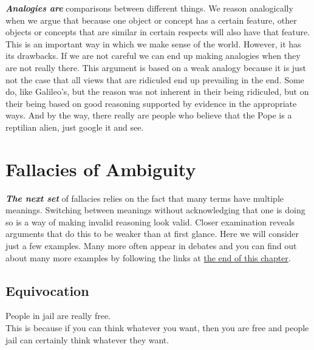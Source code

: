 \documentclass[12pt, openany]{book}
\begin{document}
\textbf{\emph{Analogies are}} comparisons between different things. We reason analogically when we argue that because one object or concept has a certain feature, other objects or concepts that are similar in certain respects will also have that feature. This is an important way in which we make sense of the world. However, it has its drawbacks. If we are not careful we can end up making analogies when they are not really there. This argument is based on a weak analogy because it is just not the case that all views that are ridiculed end up prevailing in the end. Some do, like Galileo's, but the reason was not inherent in their being ridiculed, but on their being based on good reasoning supported by evidence in the appropriate ways. And by the way, there really are people who believe that the Pope is a reptilian alien, just google it and see.

\hypertarget{ambiguity}{%
\section{Fallacies of Ambiguity}\label{ambiguity}}

\textbf{\emph{The next set}} of fallacies relies on the fact that many terms have multiple meanings. Switching between meanings without acknowledging that one is doing so is a way of making invalid reasoning look valid. Closer examination reveals arguments that do this to be weaker than at first glance. Here we will consider just a few examples. Many more often appear in debates and you can find out about many more examples by following the links at \protect\hyperlink{further-3}{the end of this chapter}.

\hypertarget{equivocation}{%
\subsection*{Equivocation}\label{equivocation}}


\begin{center}

\begin{argument}

People in jail are really free.\\

This is because if you can think whatever you want, then you are free and people jail can certainly think whatever they want.

\end{argument}

\end{center}
\end{document}
